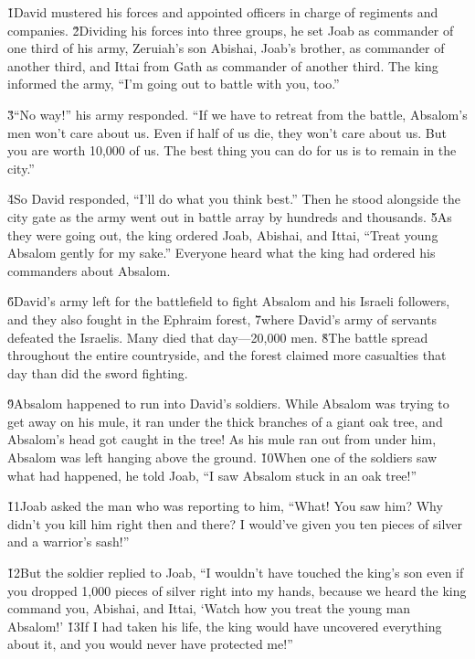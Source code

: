\v{1}David mustered his forces and appointed officers in charge of regiments and companies. \v{2}Dividing his forces into three groups, he set Joab as commander of one third of his army, Zeruiah's son Abishai, Joab's brother, as commander of another third, and Ittai from Gath as commander of another third. The king informed the army, ``I'm going out to battle with you, too.''

\v{3}``No way!'' his army responded. ``If we have to retreat from the battle, Absalom's men won't care about us. Even if half of us die, they won't care about us. But you are worth 10,000 of us. The best thing you can do for us is to remain in the city.''

\v{4}So David responded, ``I'll do what you think best.'' Then he stood alongside the city gate as the army went out in battle array by hundreds and thousands. \v{5}As they were going out, the king ordered Joab, Abishai, and Ittai, ``Treat young Absalom gently for my sake.'' Everyone heard what the king had ordered his commanders about Absalom.

\v{6}David's army left for the battlefield to fight Absalom and his Israeli followers, and they also fought in the Ephraim forest, \v{7}where David's army of servants defeated the Israelis. Many died that day---20,000 men. \v{8}The battle spread throughout the entire countryside, and the forest claimed more casualties that day than did the sword fighting.

\v{9}Absalom happened to run into David's soldiers. While Absalom was trying to get away on his mule, it ran under the thick branches of a giant oak tree, and Absalom's head got caught in the tree! As his mule ran out from under him, Absalom was left hanging above the ground. \v{10}When one of the soldiers saw what had happened, he told Joab, ``I saw Absalom stuck in an oak tree!''

\v{11}Joab asked the man who was reporting to him, ``What! You saw him? Why didn't you kill him right then and there? I would've given you ten pieces of silver and a warrior's sash!''

\v{12}But the soldier replied to Joab, ``I wouldn't have touched the king's son even if you dropped 1,000 pieces of silver right into my hands, because we heard the king command you, Abishai, and Ittai, `Watch how you treat the young man Absalom!' \v{13}If I had taken his life, the king would have uncovered everything about it, and you would never have protected me!''

